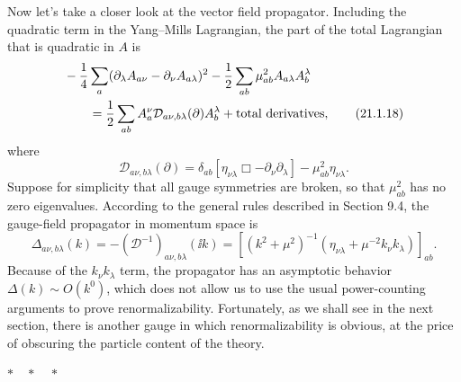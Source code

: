 Now let's take a closer look at the vector field propagator. Including the
quadratic term in the Yang--Mills Lagrangian, the part of the total
Lagrangian that is quadratic in $A$ is
\begin{align}
 &-\frac14\sum_a
 (\partial_\lambda A_{a\nu}-\partial_\nu A_{a\lambda})^2
 -\frac12\sum_{ab}\mu^2_{ab}
 A_{a\lambda}A_b^\lambda
 \notag\\
 &\qquad={}
 \frac12\sum_{ab}
 A_a^\nu\mathcal D_{a\nu,b\lambda}(\partial)
 A_b^\lambda+\text{total derivatives},
 \tag{21.1.18}\label{eq:21.1.18}
\end{align}
where
\begin{equation}
 \mathcal D_{a\nu,b\lambda}(\partial)
 =\delta_{ab}
 [\eta_{\nu\lambda}\Box-\partial_\nu\partial_\lambda]
 -\mu^2_{ab}\eta_{\nu\lambda}.
 \tag{21.1.19}\label{eq:21.1.19}
\end{equation}
Suppose for simplicity that all gauge symmetries are broken, so that
$\mu^2_{ab}$ has no zero eigenvalues. According to the general
rules described in Section 9.4, the gauge-field propagator in momentum
space is
\begin{equation}
 \Delta_{a\nu,b\lambda}(k)
 =-(\mathcal D^{-1})_{a\nu,b\lambda}(\ii k)
 =\left[(k^2+\mu^2)^{-1}
 \left(\eta_{\nu\lambda}+\mu^{-2}k_\nu k_\lambda\right)
 \right]_{ab}.
 \tag{21.1.20}\label{eq:21.1.20}
\end{equation}
Because of the $k_\nu k_\lambda$ term, the propagator has an asymptotic
behavior $\Delta(k)\sim O(k^0)$, which does not allow us to use the usual
power-counting arguments to prove renormalizability. Fortunately, as we
shall see in the next section, there is another gauge in which
renormalizability is obvious, at the price of obscuring the particle content
of the theory.

\begin{center}
$\ast\quad\ast\quad\ast$
\end{center}

